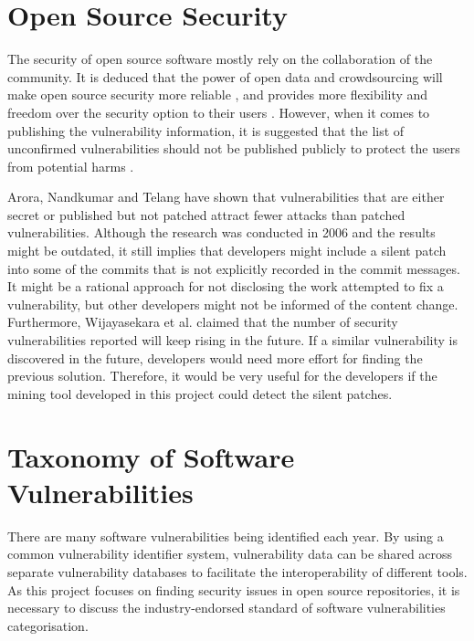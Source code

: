 \documentclass[12pt, a4paper]{report}
\begin{document}
\section{Open Source Security}
The security of open source software mostly rely on the collaboration of the community. It is
deduced that the power of open data and crowdsourcing will make open source security more reliable
\cite{hoepman_2007, witten_2001}, and provides more flexibility and freedom over the security option
to their users \cite{payne_2002}. However, when it comes to publishing the vulnerability
information, it is suggested that the list of unconfirmed vulnerabilities should not be published
publicly to protect the users from potential harms \cite{schryen_2011}.

Arora, Nandkumar and Telang \cite{arora_2006} have shown that vulnerabilities that are either secret
or published but not patched attract fewer attacks than patched vulnerabilities. Although the
research was conducted in 2006 and the results might be outdated, it still implies that developers
might include a silent patch into some of the commits that is not explicitly recorded in the commit
messages. It might be a rational approach for not disclosing the work attempted to fix a
vulnerability, but other developers might not be informed of the content change. Furthermore,
Wijayasekara et al. \cite{wijayasekara_2012} claimed that the number of security vulnerabilities
reported will keep rising in the future. If a similar vulnerability is discovered in the future,
developers would need more effort for finding the previous solution. Therefore, it would be very
useful for the developers if the mining tool developed in this project could detect the silent
patches.

\section{Taxonomy of Software Vulnerabilities}
There are many software vulnerabilities being identified each year. By using a common vulnerability
identifier system, vulnerability data can be shared across separate vulnerability databases to
facilitate the interoperability of different tools. As this project focuses on finding security
issues in open source repositories, it is necessary to discuss the industry-endorsed standard of
software vulnerabilities categorisation.
\end{document}
